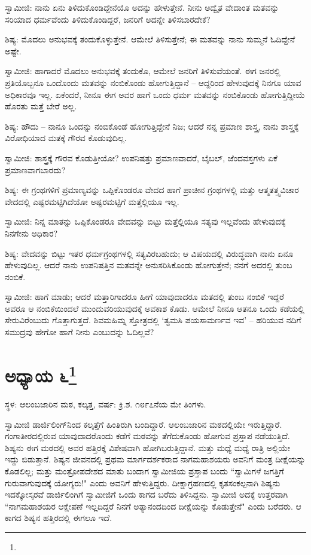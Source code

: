ಸ್ವಾಮೀಜಿ: ನಾನು ಏನು ತಿಳಿದುಕೊಂಡಿದ್ದೇನೆಯೊ ಅದನ್ನು ಹೇಳುತ್ತೇನೆ. ನೀನು ಅದ್ವೈತ ವೇದಾಂತ ಮತವನ್ನು ಸರಿಯಾದ ಧರ್ಮವೆಂದು ತಿಳಿದುಕೊಂಡಿದ್ದರೆ, ಜನರಿಗೆ ಅದನ್ನೇ ತಿಳಿಸಬಾರದೇಕೆ?

ಶಿಷ್ಯ: ಮೊದಲು ಅನುಭವಕ್ಕೆ ತಂದುಕೊಳ್ಳುತ್ತೇನೆ. ಆಮೇಲೆ ತಿಳಿಸುತ್ತೇನೆ; ಈ ಮತವನ್ನು ನಾನು ಸುಮ್ಮನೆ ಓದಿದ್ದೇನೆ ಅಷ್ಟೇ.

ಸ್ವಾಮೀಜಿ: ಹಾಗಾದರೆ ಮೊದಲು ಅನುಭವಕ್ಕೆ ತಂದುಕೊ, ಆಮೇಲೆ ಜನರಿಗೆ ತಿಳಿಸುವೆಯಂತೆ. ಈಗ ಜನರಲ್ಲಿ ಪ್ರತಿಯೊಬ್ಬನೂ ಒಂದೊಂದು ಮತವನ್ನು ನಂಬಿಕೊಂಡು ಹೋಗುತ್ತಿದ್ದಾನೆ – ಆದ್ದರಿಂದ ಹೇಳುವುದಕ್ಕೆ ನಿನಗೂ ಯಾವ ಅಧಿಕಾರವೂ ಇಲ್ಲ. ಏಕೆಂದರೆ, ನೀನೂ ಈಗ ಅವರ ಹಾಗೆ ಒಂದು ಧರ್ಮ ಮತವನ್ನು ನಂಬಿಕೊಂಡು ಹೋಗುತ್ತಿದ್ದೀಯೆ ಹೊರತು ಮತ್ತೆ ಬೇರೆ ಅಲ್ಲ.

ಶಿಷ್ಯ: ಹೌದು – ನಾನೂ ಒಂದನ್ನು ನಂಬಿಕೊಂಡೆ ಹೋಗುತ್ತಿದ್ದೇನೆ ನಿಜ; ಆದರೆ ನನ್ನ ಪ್ರಮಾಣ ಶಾಸ್ತ್ರ, ನಾನು ಶಾಸ್ತ್ರಕ್ಕೆ ವಿರೋಧಿಯಾದ ಮತಕ್ಕೆ ಗೌರವ ಕೊಡುವುದಿಲ್ಲ.

ಸ್ವಾಮೀಜಿ: ಶಾಸ್ತ್ರಕ್ಕೆ ಗೌರವ ಕೊಡುತ್ತೀಯೋ? ಉಪನಿಷತ್ತು ಪ್ರಮಾಣವಾದರೆ, ಬೈಬಲ್, ಜೆಂದವಸ್ತಗಳು ಏಕೆ ಪ್ರಮಾಣವಾಗಬಾರದು?

ಶಿಷ್ಯ: ಈ ಗ್ರಂಥಗಳಿಗೆ ಪ್ರಮಾಣ್ಯವನ್ನು ಒಪ್ಪಿಕೊಂಡರೂ ವೇದದ ಹಾಗೆ ಪ್ರಾಚೀನ ಗ್ರಂಥಗಳಲ್ಲಿ ಮತ್ತು ಆತ್ಮತತ್ತ್ವವಿಚಾರ ವೇದದಲ್ಲಿ ಎಷ್ಟರಮಟ್ಟಿಗಿದೆಯೋ ಅಷ್ಟರಮಟ್ಟಿಗೆ ಮತ್ತೆಲ್ಲಿಯೂ ಇಲ್ಲ.

ಸ್ವಾಮೀಜಿ: ನಿನ್ನ ಮಾತನ್ನು ಒಪ್ಪಿಕೊಂಡರೂ ವೇದವನ್ನು ಬಿಟ್ಟು ಮತ್ತೆಲ್ಲಿಯೂ ಸತ್ಯವು ಇಲ್ಲವೆಂದು ಹೇಳುವುದಕ್ಕೆ ನಿನಗೇನು ಅಧಿಕಾರ?

ಶಿಷ್ಯ: ವೇದವನ್ನು ಬಿಟ್ಟು ಇತರ ಧರ್ಮಗ್ರಂಥಗಳಲ್ಲಿ ಸತ್ಯವಿರಬಹುದು; ಆ ವಿಷಯದಲ್ಲಿ ವಿರುದ್ಧವಾಗಿ ನಾನು ಏನೂ ಹೇಳುವುದಿಲ್ಲ. ಆದರೆ ನಾನು ಉಪನಿಷತ್ತಿನ ಮತವನ್ನೇ ಅನುಸರಿಸಿಕೊಂಡು ಹೋಗುತ್ತೇನೆ; ನನಗೆ ಅದರಲ್ಲಿ ತುಂಬ ನಂಬಿಕೆ.

ಸ್ವಾಮೀಜಿ: ಹಾಗೆ ಮಾಡು; ಆದರೆ ಮತ್ತಾರಿಗಾದರೂ ಹೀಗೆ ಯಾವುದಾದರೂ ಮತದಲ್ಲಿ ತುಂಬ ನಂಬಿಕೆ ಇದ್ದರೆ ಅವರೂ ಆ ನಂಬಿಕೆಯಿಂದಲೆ ಮುಂದುವರಿಯುವುದಕ್ಕೆ ಅವಕಾಶ ಕೊಡು. ಆಮೇಲೆ ನೀನೂ ಆತನೂ ಒಂದು ಕಡೆಯಲ್ಲಿ ಸೇರುವಿರೆಂಬುದು ಗೊತ್ತಾಗುತ್ತದೆ. ಶಿವಮಹಿಮ್ನ ಸ್ತೋತ್ರದಲ್ಲಿ ‘ತ್ವಮಸಿ ಪಯಸಾಮರ್ಣವ ಇವ’ – ಹರಿಯುವ ನದಿಗೆ ಸಮುದ್ರವು ಹೇಗೋ ಹಾಗೆ ನೀನು ಎಂಬುದನ್ನು ಓದಿಲ್ಲವೆ?

\newpage

\chapter[ಅಧ್ಯಾಯ ೬]{ಅಧ್ಯಾಯ ೬\protect\footnote{}}

\centerline{ಸ್ಥಳ: ಆಲಂಬಜಾರಿನ ಮಠ, ಕಲ್ಕತ್ತ, ವರ್ಷ: ಕ್ರಿ.ಶ. ೧೮೯೭ನೆಯ ಮೇ ತಿಂಗಳು.}

ಸ್ವಾಮೀಜಿ ಡಾರ್ಜಿಲಿಂಗ್‌ನಿಂದ ಕಲ್ಕತ್ತೆಗೆ ಹಿಂತಿರುಗಿ ಬಂದಿದ್ದಾರೆ. ಆಲಂಬಜಾರಿನ ಮಠದಲ್ಲಿಯೇ ಇರುತ್ತಿದ್ದಾರೆ. ಗಂಗಾತೀರದಲ್ಲಿರುವ ಯಾವುದಾದರೊಂದು ಕಡೆಗೆ ಮಠವನ್ನು ತೆಗೆದುಕೊಂಡು ಹೋಗುವ ಪ್ರಸ್ತಾಪ ನಡೆಯುತ್ತಿದೆ. ಶಿಷ್ಯನು ಈಗ ಮಠದಲ್ಲಿ ಅವರ ಹತ್ತಿರಕ್ಕೆ ವಿಶೇಷವಾಗಿ ಹೋಗಿಬರುತ್ತಿದ್ದಾನೆ. ಮತ್ತು ಮಧ್ಯೆ ಮಧ್ಯೆ ರಾತ್ರಿ ಅಲ್ಲಿಯೇ ಇದ್ದು ಬಿಡುತ್ತಾನೆ. ಶಿಷ್ಯನ ಜೀವನದಲ್ಲಿ ಪ್ರಥಮ ಮಾರ್ಗದರ್ಶಕರಾದ ನಾಗಮಹಾಶಯರು ಅವನಿಗೆ ಮಂತ್ರ ದೀಕ್ಷೆಯನ್ನು ಕೊಡಲಿಲ್ಲ; ಮತ್ತು ಮಂತ್ರೋಪದೇಶದ ಮಾತು ಬಂದಾಗ ಸ್ವಾಮೀಜಿಯ ಪ್ರಸ್ತಾಪ ಬಂದು “ಸ್ವಾಮಿಗಳೆ ಜಗತ್ತಿಗೆ ಗುರುವಾಗುವುದಕ್ಕೆ ಯೋಗ್ಯರು!" ಎಂದು ಅವನಿಗೆ ಹೇಳುತ್ತಿದ್ದರು. ದೀಕ್ಷಾಗ್ರಹಣದಲ್ಲಿ ಕೃತಸಂಕಲ್ಪನಾಗಿ ಶಿಷ್ಯನು ಇದಕ್ಕೋಸ್ಕರವೆ ಡಾರ್ಜಿಲಿಂಗಿಗೆ ಸ್ವಾಮೀಜಿಗೆ ಒಂದು ಕಾಗದ ಬರೆದು ತಿಳಿಸಿದ್ದನು. ಸ್ವಾಮೀಜಿ ಅದಕ್ಕೆ ಉತ್ತರವಾಗಿ “ನಾಗಮಹಾಶಯರ ಆಕ್ಷೇಪಣೆ ಇಲ್ಲದಿದ್ದರೆ ನಿನಗೆ ಅತ್ಯಾನಂದದಿಂದ ದೀಕ್ಷೆಯನ್ನು ಕೊಡುತ್ತೇನೆ" ಎಂದು ಬರೆದರು. ಆ ಕಾಗದ ಶಿಷ್ಯನ ಹತ್ತಿರದಲ್ಲಿ ಈಗಲೂ ಇದೆ.

